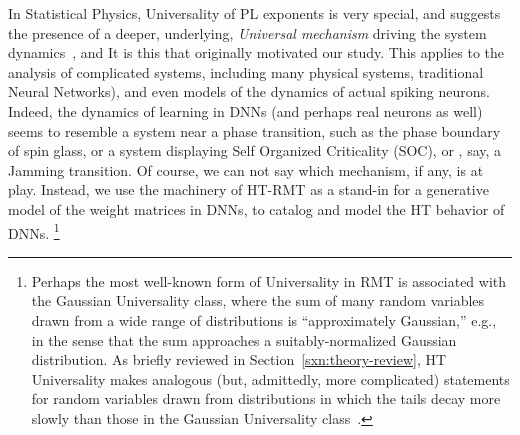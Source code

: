 {{In Statistical Physics, Universality of PL exponents is very special, and suggests the presence of a deeper, underlying, \emph{Universal mechanism}
 driving the system dynamics~\cite{SornetteBook,BouchaudPotters03}, and It  is this     that originally motivated our study.  
 This applies to the analysis of complicated systems, including many physical systems,  traditional Neural Networks\cite{EB01_BOOK,nishimori01}),
and even models of the dynamics of actual spiking neurons.
Indeed, the dynamics of learning in DNNs (and perhaps real neurons as well) seems to resemble a system near a phase transition,
such as the phase boundary of spin glass, or a system displaying Self Organized Criticality (SOC), or , say, a Jamming transition.  
Of course, we can not say which mechanism, if any, is at play.  Instead, we use the machinery of  HT-RMT 
as a stand-in for a generative model of the weight matrices in DNNs, to catalog and model the  HT behavior of DNNs.
\footnote{Perhaps the most well-known form of Universality in RMT is associated with the Gaussian Universality class, where the sum of many random variables drawn from a wide range of distributions is ``approximately Gaussian,'' e.g., in the sense that the sum approaches a suitably-normalized Gaussian distribution.  As briefly reviewed in Section~\ref{sxn:theory-review}, HT Universality makes analogous (but, admittedly, more complicated) statements for random variables drawn from distributions in which the tails decay more slowly than those in the Gaussian Universality class~\cite{MM18_TR}.}
}



}

